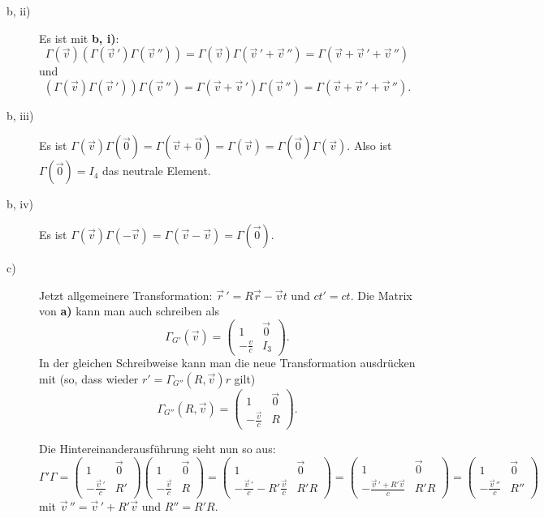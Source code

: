\begin{description}
	\item[b, ii)] Es ist mit \textbf{b, i)}:
	\[
		\Gamma(\vec{v}) \left( \Gamma(\vec{v}\,') \Gamma(\vec{v}\,'') \right) 
		= \Gamma(\vec{v}) \Gamma(\vec{v}\,' + \vec{v}\,'')
		= \Gamma(\vec{v} + \vec{v}\,' + \vec{v}\,'')
	\]
	und 
	\[
		\left( \Gamma(\vec{v}) \Gamma(\vec{v}\,') \right) \Gamma(\vec{v}\,'')
		= \Gamma(\vec{v} + \vec{v}\,') \Gamma(\vec{v}\,'')
		= \Gamma(\vec{v} + \vec{v}\,' + \vec{v}\,'')
		\text{.}
	\]
	
	\item[b, iii)]
	Es ist $\Gamma(\vec{v}) \Gamma(\vec{0}) = \Gamma(\vec{v} + \vec{0}) = \Gamma(\vec{v}) = \Gamma(\vec{0}) \Gamma(\vec{v})$. Also ist $\Gamma(\vec{0}) = I_4$ das neutrale Element.
	
	\item[b, iv)] Es ist $\Gamma(\vec{v}) \Gamma(-\vec{v}) = \Gamma(\vec{v} - \vec{v}) = \Gamma(\vec{0})$.
	
	\item[c)] Jetzt allgemeinere Transformation: $\vec{r}\,' = R \vec{r} - \vec{v} t$ und $ct' = ct$.  Die Matrix von \textbf{a)} kann man auch schreiben als
	\[
		\Gamma_{G'}(\vec{v}) = \begin{pmatrix}
			1 & \vec{0} \\
			-\frac{v}{c} & I_3
		\end{pmatrix}
		\text{.}
	\]
	In der gleichen Schreibweise kann man die neue Transformation ausdrücken mit (so, dass wieder $r' = \Gamma_{G''}(R, \vec{v}) r$ gilt)
	\[
		\Gamma_{G''}(R, \vec{v}) = \begin{pmatrix}
			1 & \vec{0} \\
			-\frac{\vec{v}}{c} & R
		\end{pmatrix}
		\text{.}
	\]
	
	Die Hintereinanderausführung sieht nun so aus:
	\[
		\Gamma' \Gamma 
		= \begin{pmatrix}
			1 & \vec{0} \\
			-\frac{\vec{v}\,'}{c} & R'
		\end{pmatrix} 
		\begin{pmatrix}
			1 & \vec{0} \\
			-\frac{\vec{v}}{c} & R
		\end{pmatrix}
		= \begin{pmatrix}
			1 & \vec{0} \\
			-\frac{\vec{v}\,'}{c} - R'\frac{\vec{v}}{c} & R' R
		\end{pmatrix}
		= \begin{pmatrix}
			1 & \vec{0} \\
			- \frac{\vec{v}\,' + R' \vec{v}}{c} & R' R
		\end{pmatrix}
		= \begin{pmatrix}
			1 & \vec{0} \\
			- \frac{\vec{v}\,''}{c} & R''
		\end{pmatrix}
	\]
	mit $\vec{v}\,'' = \vec{v}\,' + R' \vec{v}$ und $R'' = R' R$.
 
\end{description}